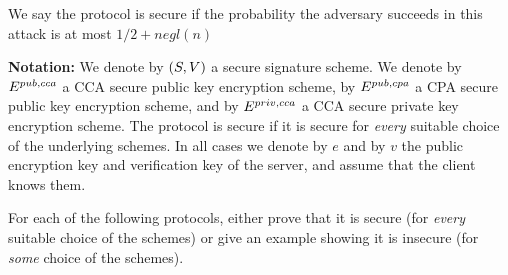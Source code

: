 \documentclass{article}
\begin{document}
\noindent{}We say the protocol is secure  if the probability the
adversary succeeds in this attack is at most $1/2+negl(n)$%

\textbf{Notation:} We denote by $(S,V)$ a secure signature scheme. We denote by $E^{pub,cca}$ a CCA secure public
key encryption scheme, by $E^{pub,cpa}$ a CPA secure public key encryption scheme, and by $E^{priv,cca}$ a CCA secure private
key encryption scheme. The protocol is secure if it is secure for \emph{every} suitable choice of the underlying
schemes. In all cases we denote by $e$ and by $v$ the public encryption key and verification key of the server, and
assume that the client knows them.%

For each of the following protocols, either prove that it is secure (for \emph{every} suitable choice of the schemes)
or give an example showing it is insecure (for \emph{some} choice of the schemes).%
\end{document}
